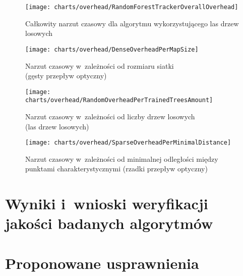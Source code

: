     \begin{figure}[!ht]
      \centering
      \texttt{[image: charts/overhead/RandomForestTrackerOverallOverhead]}
      \caption[Całkowity narzut czasowy dla algorytmu wykorzystującego las drzew losowych]
              {Całkowity narzut czasowy dla algorytmu wykorzystującego las drzew losowych}
      \label{fig:RandomForestTrackerOverhead}
    \end{figure}

    \begin{figure}[!ht]
      \centering
      \texttt{[image: charts/overhead/DenseOverheadPerMapSize]}
      \caption[Narzut czasowy w~zależności od rozmiaru siatki\\(gęsty przepływ optyczny)]
              {Narzut czasowy w~zależności od rozmiaru siatki\\(gęsty przepływ optyczny)}
      \label{fig:SpecialisedDenseOverhead}
    \end{figure}

    \begin{figure}[!ht]
      \centering
      \texttt{[image: charts/overhead/RandomOverheadPerTrainedTreesAmount]}
      \caption[Narzut czasowy w~zależności od liczby drzew losowych\\(las drzew losowych)]
              {Narzut czasowy w~zależności od liczby drzew losowych\\(las drzew losowych)}
      \label{fig:SpecialisedRandomOverhead}
    \end{figure}

    \begin{figure}[!ht]
      \centering
      \texttt{[image: charts/overhead/SparseOverheadPerMinimalDistance]}
      \caption[Narzut czasowy w~zależności od minimalnej odległości między punktami charakterystycznymi (rzadki przepływ optyczny)]
              {Narzut czasowy w~zależności od minimalnej odległości między punktami charakterystycznymi (rzadki przepływ optyczny)}
      \label{fig:SpecialisedSparseOverhead}
    \end{figure}

  \section{Wyniki i~wnioski weryfikacji jakości badanych algorytmów}\label{Section_Quality}

  \section{Proponowane usprawnienia}\label{Section_Usprawnienia}

